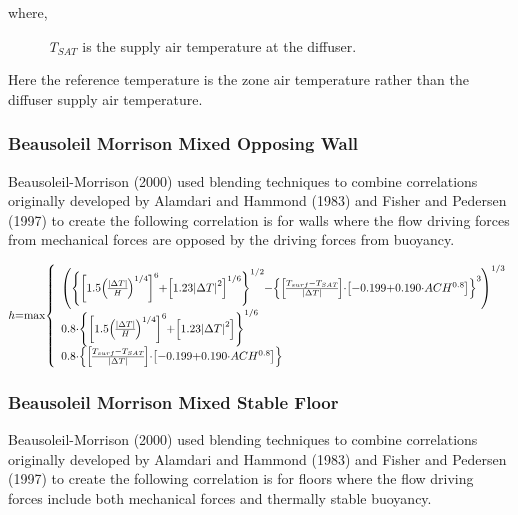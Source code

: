where,

~~~~~ \emph{T\(_{SAT}\)} is the supply air temperature at the diffuser.

Here the reference temperature is the zone air temperature rather than the diffuser supply air temperature.

\subsubsection{Beausoleil Morrison Mixed Opposing Wall}\label{beausoleil-morrison-mixed-opposing-wall}

Beausoleil-Morrison (2000) used blending techniques to combine correlations originally developed by Alamdari and Hammond (1983) and Fisher and Pedersen (1997) to create the following correlation is for walls where the flow driving forces from mechanical forces are opposed by the driving forces from buoyancy.

\begin{equation}
\medmuskip=0mu
\thinmuskip=0mu
\thickmuskip=0mu
\nulldelimiterspace=0pt
\scriptspace=0pt
h = \max \left\{
\begin{array}{l}
\left(\left\{\left[1.5\left(\frac{\left|\Delta T\right|}{H}\right)^{1/4}\right]^6+\left[1.23\left|\Delta T\right|^2\right]^{1/6}\right\}^{1/2}-\left\{\left[\frac{T_{surf}-T_{SAT}}{\left|\Delta T\right|}\right]\cdot\left[-0.199+0.190\cdot ACH^{0.8}\right]\right\}^3\right)^{1/3} \\
0.8\cdot \left\{\left[1.5\left(\frac{\left|\Delta T\right|}{H}\right)^{1/4}\right]^6+\left[1.23\left|\Delta T\right|^2\right]\right\}^{1/6} \\
0.8\cdot \left\{\left[\frac{T_{surf}-T_{SAT}}{\left|\Delta T\right|}\right]\cdot\left[-0.199+0.190\cdot ACH^{0.8}\right]\right\}
\end{array}
\right.
\end{equation}

\subsubsection{Beausoleil Morrison Mixed Stable Floor}\label{beausoleil-morrison-mixed-stable-floor}

Beausoleil-Morrison (2000) used blending techniques to combine correlations originally developed by Alamdari and Hammond (1983) and Fisher and Pedersen (1997) to create the following correlation is for floors where the flow driving forces include both mechanical forces and thermally stable buoyancy.

